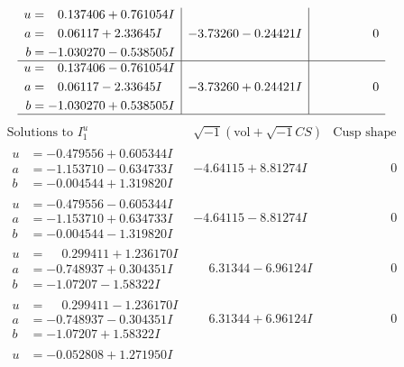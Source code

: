 \documentclass[1p]{elsarticle_modified}
\theoremstyle{definition}
\newcommand{\I}{\sqrt{-1}}
\begin{document}
$$\begin{array}{c|c|c}
\begin{aligned}
u &= \phantom{-}0.137406 + 0.761054 I \\
a &= \phantom{-}0.06117 + 2.33645 I \\
b &= -1.030270 - 0.538505 I\end{aligned}
 & -3.73260 - 0.24421 I & \phantom{-0.000000 } 0 \\ \hline\begin{aligned}
u &= \phantom{-}0.137406 - 0.761054 I \\
a &= \phantom{-}0.06117 - 2.33645 I \\
b &= -1.030270 + 0.538505 I\end{aligned}
 & -3.73260 + 0.24421 I & \phantom{-0.000000 } 0\\
 \hline 
 \end{array}$$\newpage$$\begin{array}{c|c|c}  
\text{Solutions to }I^u_{1}& \I (\text{vol} + \sqrt{-1}CS) & \text{Cusp shape}\\
 \hline 
\begin{aligned}
u &= -0.479556 + 0.605344 I \\
a &= -1.153710 - 0.634733 I \\
b &= -0.004544 + 1.319820 I\end{aligned}
 & -4.64115 + 8.81274 I & \phantom{-0.000000 } 0 \\ \hline\begin{aligned}
u &= -0.479556 - 0.605344 I \\
a &= -1.153710 + 0.634733 I \\
b &= -0.004544 - 1.319820 I\end{aligned}
 & -4.64115 - 8.81274 I & \phantom{-0.000000 } 0 \\ \hline\begin{aligned}
u &= \phantom{-}0.299411 + 1.236170 I \\
a &= -0.748937 + 0.304351 I \\
b &= -1.07207 - 1.58322 I\end{aligned}
 & \phantom{-}6.31344 - 6.96124 I & \phantom{-0.000000 } 0 \\ \hline\begin{aligned}
u &= \phantom{-}0.299411 - 1.236170 I \\
a &= -0.748937 - 0.304351 I \\
b &= -1.07207 + 1.58322 I\end{aligned}
 & \phantom{-}6.31344 + 6.96124 I & \phantom{-0.000000 } 0 \\ \hline\begin{aligned}
u &= -0.052808 + 1.271950 I \\

\end{aligned}
\end{array}$$
\end{document}
